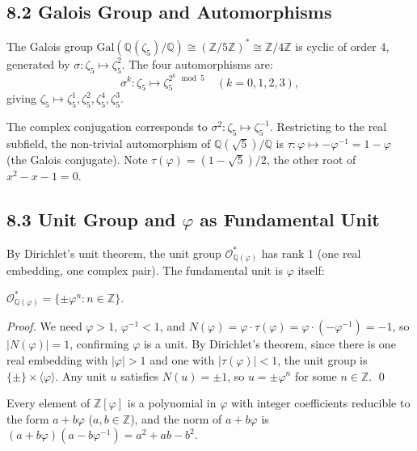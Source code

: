 \subsection{8.2 Galois Group and Automorphisms}
\label{sec:cyc-galois}

The Galois group
\(\mathrm{Gal}(\mathbb{Q}(\zeta_5)/\mathbb{Q})
\cong (\mathbb{Z}/5\mathbb{Z})^* \cong \mathbb{Z}/4\mathbb{Z}\)
is cyclic of order 4, generated by
\(\sigma: \zeta_5 \mapsto \zeta_5^2\). The four
automorphisms are:
\[
  \sigma^k: \zeta_5 \mapsto \zeta_5^{2^k \mod 5}
  \quad (k = 0,1,2,3),
\]
giving \(\zeta_5 \mapsto \zeta_5^1, \zeta_5^2,
\zeta_5^4, \zeta_5^3\).

The complex conjugation corresponds to
\(\sigma^2: \zeta_5 \mapsto \zeta_5^{-1}\).
Restricting to the real subfield, the non-trivial
automorphism of \(\mathbb{Q}(\sqrt{5})/\mathbb{Q}\)
is \(\tau: \varphi \mapsto -\varphi^{-1} = 1-\varphi\)
(the Galois conjugate). Note
\(\tau(\varphi) = (1-\sqrt{5})/2\), the other root
of \(x^2 - x - 1 = 0\).

\subsection{8.3 Unit Group and
\texorpdfstring{$\varphi$}{phi} as Fundamental Unit}
\label{sec:cyc-units}

By Dirichlet's unit theorem, the unit group
\(\mathcal{O}_{\mathbb{Q}(\varphi)}^*\) has
rank 1 (one real embedding, one complex pair).
The fundamental unit is \(\varphi\) itself:

\begin{proposition}
\(\mathcal{O}_{\mathbb{Q}(\varphi)}^* = \{\pm
\varphi^n : n \in \mathbb{Z}\}\).
\end{proposition}

\begin{proof}
We need \(\varphi > 1\), \(\varphi^{-1} < 1\), and
\(N(\varphi) = \varphi \cdot \tau(\varphi) =
\varphi \cdot (-\varphi^{-1}) = -1\), so
\(|N(\varphi)| = 1\), confirming \(\varphi\) is a
unit. By Dirichlet's theorem, since there is one
real embedding with \(|\varphi| > 1\) and one with
\(|\tau(\varphi)| < 1\), the unit group is
\(\{\pm\} \times \langle \varphi \rangle\).
Any unit \(u\) satisfies \(N(u) = \pm 1\), so
\(u = \pm \varphi^n\) for some \(n \in \mathbb{Z}\).
\qed
\end{proof}

\begin{corollary}
Every element of \(\mathbb{Z}[\varphi]\) is a
polynomial in \(\varphi\) with integer coefficients
reducible to the form \(a + b\varphi\) (\(a, b \in
\mathbb{Z}\)), and the norm of \(a + b\varphi\) is
\((a + b\varphi)(a - b\varphi^{-1}) = a^2 + ab - b^2\).
\end{corollary}

